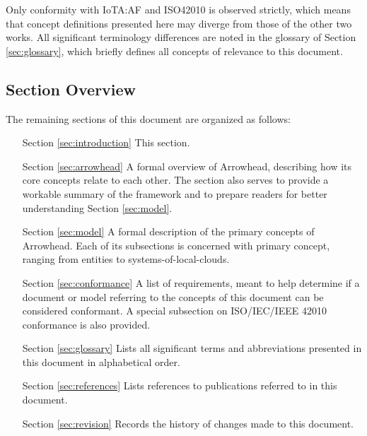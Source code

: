 Only conformity with IoTA:AF and ISO42010 is observed strictly, which means that concept definitions presented here may diverge from those of the other two works.
All significant terminology differences are noted in the glossary of Section \ref{sec:glossary}, which briefly defines all concepts of relevance to this document.

\subsection{Section Overview}
\label{sec:introduction:sections}

The remaining sections of this document are organized as follows:
\vspace*{2mm}
\begin{itemize}[leftmargin=2cm,rightmargin=0pt,labelwidth=2cm,labelsep=0pt,itemindent=0pt,parsep=0.1cm,topsep=0.1cm,align=left]

\item[Section \ref{sec:introduction}]
This section.

\item[Section \ref{sec:arrowhead}]
A formal overview of Arrowhead, describing how its core concepts relate to each other.
The section also serves to provide a workable summary of the framework and to prepare readers for better understanding Section \ref{sec:model}.

\item[Section \ref{sec:model}]
A formal description of the primary concepts of Arrowhead.
Each of its subsections is concerned with primary concept, ranging from entities to systems-of-local-clouds.

\item[Section \ref{sec:conformance}]
A list of requirements, meant to help determine if a document or model referring to the concepts of this document can be considered conformant.
A special subsection on ISO/IEC/IEEE 42010 conformance is also provided.

\item[Section \ref{sec:glossary}]
Lists all significant terms and abbreviations presented in this document in alphabetical order.

\item[Section \ref{sec:references}]
Lists references to publications referred to in this document.

\item[Section \ref{sec:revision}]
Records the history of changes made to this document.

\end{itemize}
